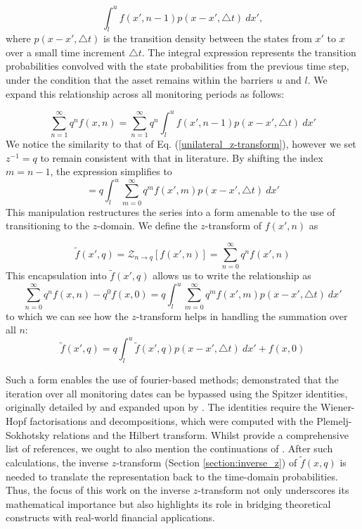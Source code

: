 \documentclass[a4paper]{report}
\begin{document}
\begin{equation}
\int^u_l f(x', n-1)p(x - x', \triangle t)\ dx',	
\end{equation}
where $p(x - x', \triangle t)$ is the transition density between the states from $x'$ to $x$ over a small time increment $\triangle t$. The integral expression represents the transition probabilities convolved with the state probabilities from the previous time step, under the condition that the asset remains within the barriers $u$ and $l$. We expand this relationship across all monitoring periods as follows:

\begin{equation}
\sum^{\infty}_{n = 1} q^n f(x, n) = \sum^{\infty}_{n = 1} q^n \int^u_l f(x', n-1)p(x - x', \triangle t)\ dx'	
\end{equation}
We notice the similarity to that of Eq. (\ref{unilateral_z-transform}), however we set $z^{-1} = q$ to remain consistent with that in literature. By shifting the index $m = n-1$, the expression simplifies to
\begin{equation}
= q \int^u_l \sum^{\infty}_{m = 0} q^m f(x', m) p(x - x', \triangle t)\ dx'	
\end{equation}
This manipulation restructures the series into a form amenable to the use of transitioning to the $z$-domain. We define the $z$-transform of $f(x', n)$ as

\begin{equation}
\tilde{f}(x', q) = \mathcal{Z}_{n \rightarrow q}[f(x', n)] = \sum^{\infty}_{n = 0} q^nf(x', n)
\end{equation}
This encapsulation into $\tilde{f}(x', q)$ allows us to write the relationship as
\begin{equation}
\sum^{\infty}_{n = 0} q^n f(x, n) -q^0f(x, 0) = q\int^u_l \sum^{\infty}_{m = 0}q^m f(x', m) p(x-x', \triangle t)\ dx'	
\end{equation}
to which we can see how the $z$-transform helps in handling the summation over all $n$:
\begin{equation}
\tilde{f}(x', q) = q\int^u_l \tilde{f}(x', q)p(x - x', \triangle t)\ dx' + f(x, 0)
\end{equation}

Such a form enables the use of fourier-based methods; \citet{fusai2016spitzer} demonstrated that the iteration over all monitoring dates can be bypassed using the Spitzer identities, originally detailed by \citet{spitzer1957wiener} and expanded upon by \citet{kemperman1963wiener}. The identities require the Wiener-Hopf factorisations and decompositions, which were computed with the Plemelj-Sokhotsky relations and the Hilbert transform. Whilst \citet{fusai2016spitzer} provide a comprehensive list of references, we ought to also mention the continuations of \citet{phelan2018fluctuation, phelan2019hilbert, loveless2023phelanguido}. After such calculations, the inverse $z$-transform (Section \ref{section:inverse_z}) of $\tilde{f}(x, q)$ is needed to translate the representation back to the time-domain probabilities. Thus, the focus of this work on the inverse $z$-transform not only underscores its mathematical importance but also highlights its role in bridging theoretical constructs with real-world financial applications. 
\end{document}
